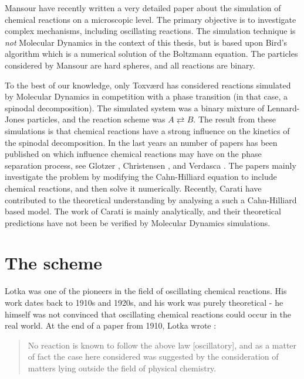 Mansour \etal \cite{Mansour92} have recently written a very detailed
paper about the simulation of chemical reactions on a microscopic
level. The primary objective is to investigate complex mechanisms,
including oscillating reactions. The simulation technique is
\textit{not} Molecular Dynamics in the context of this thesis, but
is based upon Bird's algorithm \cite{Bird96} which is a numerical
solution of the Boltzmann equation. The particles considered by Mansour
\etal are hard spheres, and all reactions are binary.


To the best of our knowledge, only Toxv{\ae}rd \cite{Toxvaerd96a} has
considered reactions simulated by Molecular Dynamics in competition
with a phase transition (in that case, a spinodal decomposition). The
simulated system was a binary mixture of Lennard-Jones particles, and
the reaction scheme was $A \rightleftarrows B$. The result from these 
simulations is that chemical reactions have a strong influence on the
kinetics of the spinodal decomposition. In the last years an number of
papers has been published on which influence chemical reactions may
have on the phase separation process, see \eg Glotzer \etal
\cite{Glotzer94,Glotzer95}, Christensen \etal \cite{Christensen96}, and
Verdasca \etal \cite{Verdasca95}. The papers mainly investigate the
problem by modifying the Cahn-Hilliard equation to include chemical
reactions, and then solve it numerically. Recently, Carati \etal
\cite{Carati97} have contributed to the theoretical understanding by
analysing a such a Cahn-Hilliard based model. The work of Carati \etal
is mainly analytically, and their theoretical predictions have not been
be verified by \eg Molecular Dynamics simulations.


\section{The scheme}
\label{sect:ExtLotkaMech}
Lotka was one of the pioneers in the field of oscillating chemical
reactions. His work dates back to 1910s and 1920s, and his work was
purely theoretical - he himself was not convinced that oscillating
chemical reactions could occur in the real world. At the end of a paper
from 1910, Lotka wrote \cite{Lotka10}:

\begin{quotation}
\noindent No reaction is known to follow the above law [oscillatory],
and as a matter of fact the case here considered was suggested by the
consideration of matters lying outside the field of physical
chemistry.
\end{quotation}


